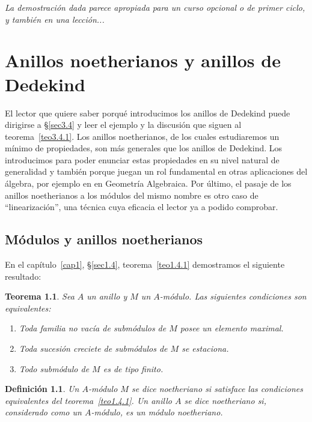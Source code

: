 \documentclass[oneside,bibtotoc,leqno,spanish]{amsbook}
\numberwithin{equation}{section}
\newenvironment{comm}%
	{\begin{trivlist}\item\small\itshape}
	{\end{trivlist}}
\theoremstyle{defi}
\newtheorem{definition}{Definici\'on}
\theoremstyle{note}
\newtheorem{theorem}{Teorema}
\theoremstyle{rem}
\numberwithin{theorem}{section}
\numberwithin{proposition}{section}
\numberwithin{definition}{section}
\numberwithin{lemma}{section}
\numberwithin{corollary}{section}
\numberwithin{example}{section}
\numberwithin{footnote}{section}%
\begin{document}
\begin{comm}
La demostraci\'on dada parece apropiada para un curso opcional o de primer ciclo, y tambi\'en
en una lecci\'on...
\end{comm}

\chapter{Anillos noetherianos y anillos de Dedekind}\label{cap3}

El lector que quiere saber porqu\'e introducimos los anillos de Dedekind puede dirigirse
a \S\ref{sec3.4} y leer el ejemplo y la discusi\'on que siguen al teorema~\ref{teo3.4.1}.
Los anillos noetherianos, de los cuales estudiaremos un m\'inimo de propiedades, son m\'as generales que los
anillos de Dedekind. Los introducimos para poder enunciar estas propiedades en su
nivel natural de generalidad y tambi\'en porque juegan un rol fundamental en otras aplicaciones
del \'algebra, por ejemplo en en Geometr\'ia Algebraica. Por \'ultimo, el pasaje de los anillos noetherianos
a los m\'odulos del mismo nombre es otro caso de ``linearizaci\'on'', una t\'ecnica cuya eficacia
el lector ya a podido comprobar.

\section{M\'odulos y anillos noetherianos}\label{sec3.1}

En el cap\'itulo~\ref{cap1}, \S\ref{sec1.4}, teorema~\ref{teo1.4.1} demostramos el siguiente resultado:

\begin{theorem}\label{teo3.1.1}
Sea $A$ un anillo y $M$ un $A$-m\'odulo. Las siguientes condiciones son equivalentes:
\begin{enumerate}
\item[a)] Toda familia no vac\'ia de subm\'odulos de $M$ posee un elemento maximal.
\item[b)] Toda sucesi\'on creciete de subm\'odulos de $M$ se estaciona.
\item[c)] Todo subm\'odulo de $M$ es de tipo finito.
\end{enumerate}
\end{theorem}

\begin{definition}
Un $A$-m\'odulo $M$ se dice noetheriano si satisface las condiciones equivalentes del
teorema~\ref{teo1.4.1}. Un anillo $A$ se dice noetheriano si, considerado como un $A$-m\'odulo, es
un m\'odulo noetheriano.
\end{definition}
\end{document}
